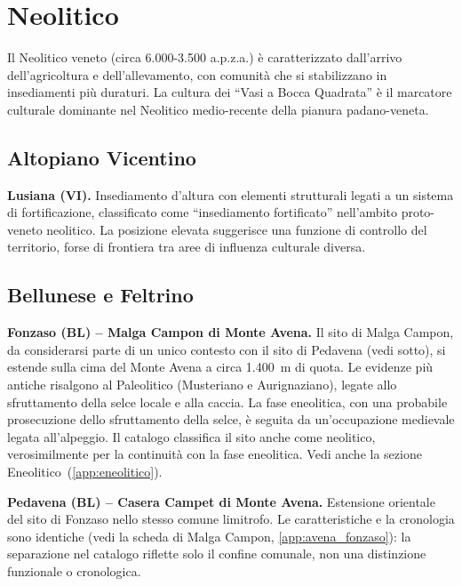 \section{Neolitico}
\label{app:neolitico}

Il Neolitico veneto (circa 6.000-3.500 a.p.z.a.) è caratterizzato dall'arrivo dell'agricoltura e dell'allevamento, con comunità che si stabilizzano in insediamenti più duraturi. La cultura dei ``Vasi a Bocca Quadrata'' è il marcatore culturale dominante nel Neolitico medio-recente della pianura padano-veneta.

\subsection{Altopiano Vicentino}

\textbf{Lusiana (VI).} Insediamento d'altura con elementi strutturali legati a un sistema di fortificazione, classificato come ``insediamento fortificato'' nell'ambito proto-veneto neolitico. La posizione elevata suggerisce una funzione di controllo del territorio, forse di frontiera tra aree di influenza culturale diversa.

\subsection{Bellunese e Feltrino}

\textbf{Fonzaso (BL) -- Malga Campon di Monte Avena.} \label{app:avena_fonzaso} Il sito di Malga Campon, da considerarsi parte di un unico contesto con il sito di Pedavena (vedi sotto), si estende sulla cima del Monte Avena a circa 1.400~m di quota. Le evidenze più antiche risalgono al Paleolitico (Musteriano e Aurignaziano), legate allo sfruttamento della selce locale e alla caccia. La fase eneolitica, con una probabile prosecuzione dello sfruttamento della selce, è seguita da un'occupazione medievale legata all'alpeggio. Il catalogo classifica il sito anche come neolitico, verosimilmente per la continuità con la fase eneolitica. Vedi anche la sezione Eneolitico~(\ref{app:eneolitico}).

\textbf{Pedavena (BL) -- Casera Campet di Monte Avena.} Estensione orientale del sito di Fonzaso nello stesso comune limitrofo. Le caratteristiche e la cronologia sono identiche (vedi la scheda di Malga Campon, \ref{app:avena_fonzaso}): la separazione nel catalogo riflette solo il confine comunale, non una distinzione funzionale o cronologica.

